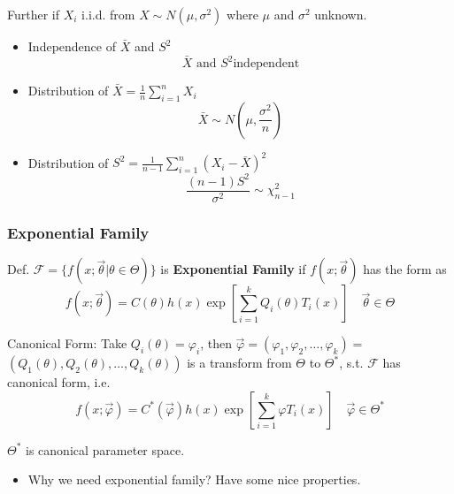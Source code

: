\documentclass[11pt,a4paper]{ctexart}
\numberwithin{equation}{section}%
\begin{document}
    Further if $X_i$ i.i.d. from $X\sim N(\mu,\sigma^2)$ where $\mu$ and $\sigma^2$ unknown.
    \begin{itemize}
        \item Independence of $\bar{X}$ and $S^2$ \[\bar{X}\text{ and }S^2 \text{independent}\]
        \item Distribution of $\bar{X}={\displaystyle\frac{1}{n}\sum_{i=1}^n X_i}$
        \[\bar{X}\sim N(\mu,\frac{\sigma^2}{n})\]
        \item Distribution of $S^2={\displaystyle\frac{1}{n-1}\sum_{i=1}^n(X_i-\bar{X})^2}$
        \[\frac{(n-1)S^2}{\sigma^2}\sim\chi^2_{n-1}\]
    \end{itemize}

    \subsubsection{Exponential Family}\label{SubSectionExponentialFamily}
        Def. $\mathscr{F}=\{f(x;\vec{\theta}|\theta\in\Theta)\}$ is \textbf{Exponential Family} if $f(x;\vec{\theta})$ has the form as
\[
    f(x;\vec{\theta})=C(\theta)h(x)\exp \left[  \sum_{i=1}^k Q_i(\theta)T_i(x) \right]\quad\vec{\theta}\in\Theta
\]    

    Canonical Form: Take $Q_i(\theta)=\varphi_i$, then $\vec{\varphi}=(\varphi_1,\varphi_2,\ldots,\varphi_k)=$$(Q_1(\theta),Q_2(\theta),\ldots,Q_k(\theta))$ is a transform from $\Theta$ to $\Theta^*$, s.t. $\mathscr{F}$ has canonical form, i.e.
    \[
        f(x;\vec{\varphi})=C^*(\vec{\varphi})h(x)   \exp\left[  \sum_{i=1}^k \varphi T_i(x) \right] \quad \vec{\varphi}\in\Theta^*
    \]

    $\Theta^*$ is canonical parameter space.

    \begin{itemize}
        \item Why we need exponential family? Have some nice properties.
    \end{itemize}
\end{document}
